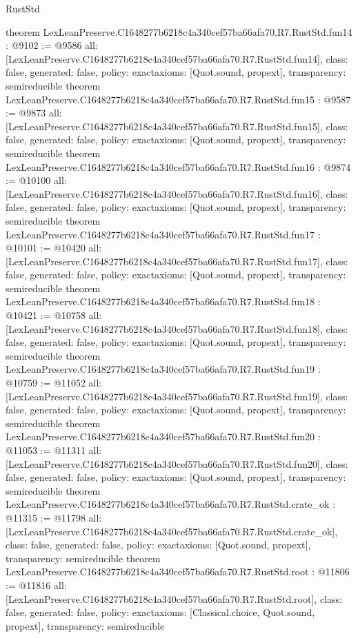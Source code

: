 \begin{lexlean}{RustStd}
\begin{coremodule}
{}
theorem LexLeanPreserve.C1648277b6218c4a340cef57ba66afa70.R7.RustStd.fun14 : @9102 := @9586 {
  all: [LexLeanPreserve.C1648277b6218c4a340cef57ba66afa70.R7.RustStd.fun14],
  class: false,
  generated: false,
  policy: exact{axioms: [Quot.sound, propext]},
  transparency: semireducible
}
theorem LexLeanPreserve.C1648277b6218c4a340cef57ba66afa70.R7.RustStd.fun15 : @9587 := @9873 {
  all: [LexLeanPreserve.C1648277b6218c4a340cef57ba66afa70.R7.RustStd.fun15],
  class: false,
  generated: false,
  policy: exact{axioms: [Quot.sound, propext]},
  transparency: semireducible
}
theorem LexLeanPreserve.C1648277b6218c4a340cef57ba66afa70.R7.RustStd.fun16 : @9874 := @10100 {
  all: [LexLeanPreserve.C1648277b6218c4a340cef57ba66afa70.R7.RustStd.fun16],
  class: false,
  generated: false,
  policy: exact{axioms: [Quot.sound, propext]},
  transparency: semireducible
}
theorem LexLeanPreserve.C1648277b6218c4a340cef57ba66afa70.R7.RustStd.fun17 : @10101 := @10420 {
  all: [LexLeanPreserve.C1648277b6218c4a340cef57ba66afa70.R7.RustStd.fun17],
  class: false,
  generated: false,
  policy: exact{axioms: [Quot.sound, propext]},
  transparency: semireducible
}
theorem LexLeanPreserve.C1648277b6218c4a340cef57ba66afa70.R7.RustStd.fun18 : @10421 := @10758 {
  all: [LexLeanPreserve.C1648277b6218c4a340cef57ba66afa70.R7.RustStd.fun18],
  class: false,
  generated: false,
  policy: exact{axioms: [Quot.sound, propext]},
  transparency: semireducible
}
theorem LexLeanPreserve.C1648277b6218c4a340cef57ba66afa70.R7.RustStd.fun19 : @10759 := @11052 {
  all: [LexLeanPreserve.C1648277b6218c4a340cef57ba66afa70.R7.RustStd.fun19],
  class: false,
  generated: false,
  policy: exact{axioms: [Quot.sound, propext]},
  transparency: semireducible
}
theorem LexLeanPreserve.C1648277b6218c4a340cef57ba66afa70.R7.RustStd.fun20 : @11053 := @11311 {
  all: [LexLeanPreserve.C1648277b6218c4a340cef57ba66afa70.R7.RustStd.fun20],
  class: false,
  generated: false,
  policy: exact{axioms: [Quot.sound, propext]},
  transparency: semireducible
}
theorem LexLeanPreserve.C1648277b6218c4a340cef57ba66afa70.R7.RustStd.crate_ok : @11315 := @11798 {
  all: [LexLeanPreserve.C1648277b6218c4a340cef57ba66afa70.R7.RustStd.crate_ok],
  class: false,
  generated: false,
  policy: exact{axioms: [Quot.sound, propext]},
  transparency: semireducible
}
theorem LexLeanPreserve.C1648277b6218c4a340cef57ba66afa70.R7.RustStd.root : @11806 := @11816 {
  all: [LexLeanPreserve.C1648277b6218c4a340cef57ba66afa70.R7.RustStd.root],
  class: false,
  generated: false,
  policy: exact{axioms: [Classical.choice, Quot.sound, propext]},
  transparency: semireducible
}


\end{coremodule}
\end{lexlean}
